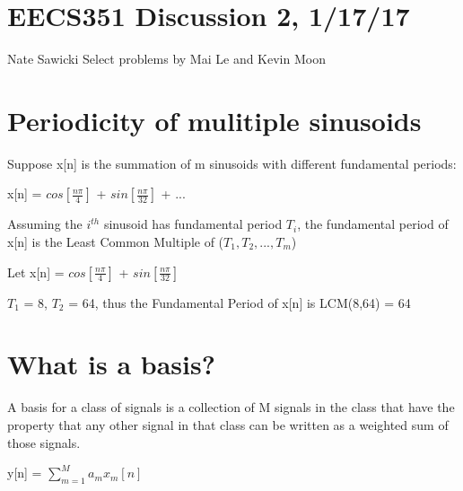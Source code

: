 \documentclass[11pt]{article}
\begin{document}
\section*{EECS351 Discussion 2, 1/17/17}
Nate Sawicki \newline
Select problems by Mai Le and Kevin Moon

\section{Periodicity of mulitiple sinusoids}

Suppose x[n] is the summation of m sinusoids with different fundamental periods:

\vspace{3mm}

\begin{center}

x[n] = $cos[\frac{n\pi}{4}]$ + $sin[\frac{n\pi}{32}]$ + ...

\end{center}


\vspace{3mm}

Assuming the $i^{th}$ sinusoid has fundamental period $T_i$, the fundamental period of x[n] is the Least Common Multiple of ($T_1, T_2, ..., T_m$)\newline

\vspace{20mm}

\begin{center}
Let x[n]  = $cos[\frac{n\pi}{4}]$ + $sin[\frac{n\pi}{32}]$ 
\end{center}

\vspace{3mm}
$T_1$ = 8, $T_2$ = 64, thus the Fundamental Period of x[n] is LCM(8,64) = 64\newline

\vspace{3mm}

\section{What is a basis?}
A basis for a class of signals is a collection of M signals in the class that have the property that any other signal in that class can be written as a weighted sum of those signals.

\begin{center}
y[n] = $\sum\limits_{m = 1}^M a_m x_m[n]$
\end{center}
\end{document}
